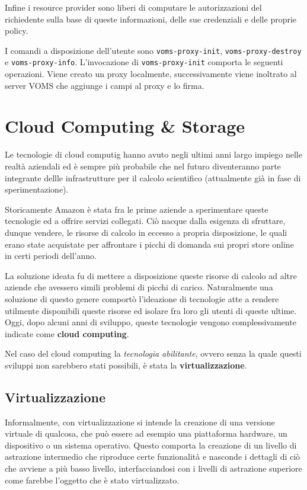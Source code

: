 \documentclass[italian,]{article}
\begin{document}
Infine i resource provider sono liberi di computare le autorizzazioni
del richiedente sulla base di queste informazioni, delle sue credenziali
e delle proprie policy.

I comandi a disposizione dell'utente sono \texttt{voms-proxy-init},
\texttt{voms-proxy-destroy} e \texttt{voms-proxy-info}. L'invocazione di
\texttt{voms-proxy-init} comporta le seguenti operazioni. Viene creato
un proxy localmente, successivamente viene inoltrato al server VOMS che
aggiunge i campi al proxy e lo firma.

\section{Cloud Computing \& Storage}\label{cloud-computing-storage}

Le tecnologie di cloud computig hanno avuto negli ultimi anni largo
impiego nelle realtà aziendali ed è sempre più probabile che nel futuro
diventeranno parte integrante dellle infrastrutture per il calcolo
scientifico (attualmente già in fase di sperimentazione).

Storicamente Amazon è stata fra le prime aziende a sperimentare queste
tecnologie ed a offrire servizi collegati. Ciò nacque dalla esigenza di
sfruttare, dunque vendere, le risorse di calcolo in eccesso a propria
disposizione, le quali erano state acquistate per affrontare i picchi di
domanda sui propri store online in certi periodi dell'anno.

La soluzione ideata fu di mettere a disposizione queste risorse di
calcolo ad altre aziende che avessero simili problemi di picchi di
carico. Naturalmente una soluzione di questo genere comportò l'ideazione
di tecnologie atte a rendere utilmente disponibili queste risorse ed
isolare fra loro gli utenti di queste ultime. Oggi, dopo alcuni anni di
sviluppo, queste tecnologie vengono complessivamente indicate come
\textbf{cloud computing}.

Nel caso del cloud computing la \emph{tecnologia abilitante}, ovvero
senza la quale questi sviluppi non sarebbero stati possibili, è stata la
\textbf{virtualizzazione}.

\subsection{Virtualizzazione}\label{virtualizzazione}

Informalmente, con virtualizzazione si intende la creazione di una
versione virtuale di qualcosa, che può essere ad esempio una piattaforma
hardware, un dispositivo o un sistema operativo. Questo comporta la
creazione di un livello di astrazione intermedio che riproduce certe
funzionalità e nasconde i dettagli di ciò che avviene a più basso
livello, interfacciandosi con i livelli di astrazione superiore come
farebbe l'oggetto che è stato virtualizzato.
\end{document}
